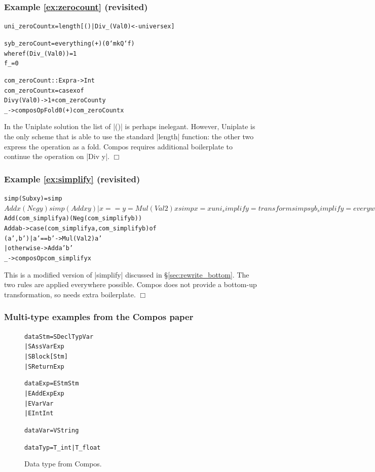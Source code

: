 \documentclass[preprint]{sigplanconf}
\newcommand{\noexample}{\hfill$\Box$}
\newenvironment{code}{\begin{alltt}\small}{\end{alltt}}
\newenvironment{revisit}[1]{\subsubsection*{Example #1 (revisited)}}{\noexample}
\newcommand{\ignore}{}
\begin{document}
\begin{revisit}{\ref{ex:zerocount}}

\ignore\begin{code}
uni_zeroCount x = length [() | Div _ (Val 0) <- universe x]

syb_zeroCount = everything (+) (0 `mkQ` f)
    where  f (Div _ (Val 0))  = 1
           f _                = 0

com_zeroCount :: Expr a -> Int
com_zeroCount x = case x of
    Div y (Val 0) -> 1 + com_zeroCount y
    _ -> composOpFold 0 (+) com_zeroCount x
\end{code}

In the Uniplate solution the list of |()| is perhaps inelegant. However, Uniplate is the only scheme that is able to use the standard |length| function: the other two express the operation as a fold. Compos requires additional boilerplate to continue the operation on |Div y|.
\end{revisit}

\begin{revisit}{\ref{ex:simplify}}

\ignore\begin{code}
simp (Sub x y)           = simp $ Add x (Neg y)
simp (Add x y) | x == y  = Mul (Val 2) x
simp x                   = x

uni_simplify = transform simp

syb_simplify = everywhere (mkT simp)

com_simplify :: Expr a -> Expr a
com_simplify x = case x of
    Sub  a b -> com_simplify $
        Add (com_simplify a) (Neg (com_simplify b))
    Add  a b -> case  (com_simplify a, com_simplify b) of
                      (a',b')  | a' == b'   -> Mul (Val 2) a'
                               | otherwise  -> Add a' b'
    _ -> composOp com_simplify x
\end{code}

This is a modified version of |simplify| discussed in \S\ref{sec:rewrite_bottom}. The two rules are applied everywhere possible. Compos does not provide a bottom-up transformation, so needs extra boilerplate.
\end{revisit}

\subsubsection{Multi-type examples from the Compos paper}

\begin{figure}
\ignore\begin{code}
data Stm  =  SDecl    Typ Var
          |  SAss     Var Exp
          |  SBlock   [Stm]
          |  SReturn  Exp

data Exp  =  EStm  Stm
          |  EAdd  Exp Exp
          |  EVar  Var
          |  EInt  Int

data Var  =  V String

data Typ  =  T_int | T_float
\end{code}
\caption{Data type from Compos.}
\label{fig:compos}
\end{figure}
\end{document}
